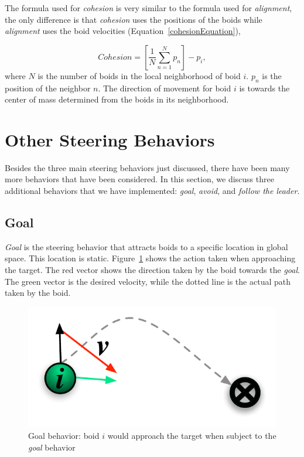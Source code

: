 The formula used for \textit{cohesion} is very similar to the formula used for \textit{alignment}, the only difference is that \textit{cohesion} uses the positions of the boids while \textit{alignment} uses the boid velocities (Equation~\ref{cohesionEquation}),

\begin{equation}
\label{cohesionEquation}
Cohesion = \left[  \frac{1}{N} \sum_{n=1}^{N} p_n \right ] - p_i, 
\end{equation}
where $N$ is the number of boids in the local neighborhood of boid $i$. $p_n$ is the position of the neighbor $n$. The direction of movement for boid $i$ is towards the center of mass determined from the boids in its neighborhood. 

\section{Other Steering Behaviors}\label{otherbehaviors}
Besides the three main steering behaviors just discussed, there have been many more behaviors that have been considered. In this section, we discuss three additional behaviors that we have implemented: \textit{goal}, \textit{avoid}, and \textit{follow the leader}.

\subsection{Goal}
\textit{Goal} is the steering behavior that attracts boids to a specific location in global space. This location is static. Figure~\ref{goalPDF} shows the action taken when approaching the target. The red vector shows the direction taken by the boid towards the \textit{goal}. The green vector is the desired velocity, while the dotted line is the actual path taken by the boid.

\begin{figure}[htbp]
\begin{center}
\includegraphics[scale=0.95]{figures/goal.pdf}
\caption{Goal behavior: boid $i$ would approach the target when subject to the \textit{goal} behavior}
\label{goalPDF}
\end{center}
\end{figure}

